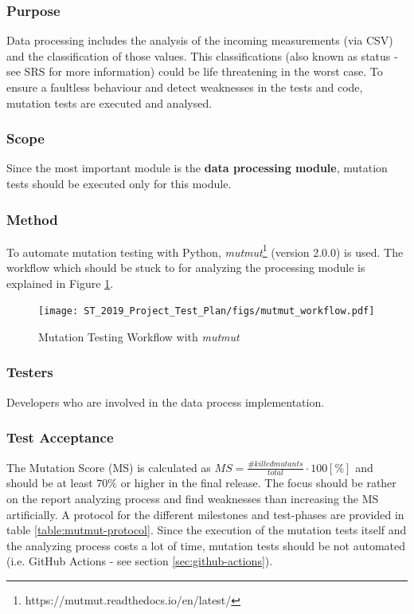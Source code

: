 \documentclass[a4paper]{article}
\begin{document}
\subsubsection*{Purpose}
Data processing includes the analysis of the incoming measurements (via CSV) and the classification of those values. This classifications (also known as status - see SRS for more information) could be life threatening in the worst case. To ensure a faultless behaviour and detect weaknesses in the tests and code, mutation tests are executed and analysed.

\subsubsection*{Scope}
Since the most important module is the \textbf{data processing module}, mutation tests should be executed only for this module.

\subsubsection*{Method}
To automate mutation testing with Python, \textit{mutmut}\footnote{https://mutmut.readthedocs.io/en/latest/} (version 2.0.0) is used. The workflow which should be stuck to for analyzing the processing module is explained in Figure \ref{fig:mutmut-workflow}.

\begin{figure}[H]
\centering
    \texttt{[image: ST\_2019\_Project\_Test\_Plan/figs/mutmut\_workflow.pdf]}
    \caption{Mutation Testing Workflow with \textit{mutmut}}
    \label{fig:mutmut-workflow}
\end{figure}

\subsubsection*{Testers}
Developers who are involved in the data process implementation.

\subsubsection*{Test Acceptance}
The Mutation Score (MS) is calculated as $MS = \frac{\#killed mutants}{total} \cdot 100 [\%]$ and should be at least $70\%$ or higher in the final release. The focus should be rather on the report analyzing process and find weaknesses than increasing the MS artificially. A protocol for the different milestones and test-phases are provided in table \ref{table:mutmut-protocol}. Since the execution of the mutation tests itself and the analyzing process costs a lot of time, mutation tests should be not automated (i.e. GitHub Actions - see section \ref{sec:github-actions}).
\end{document}
